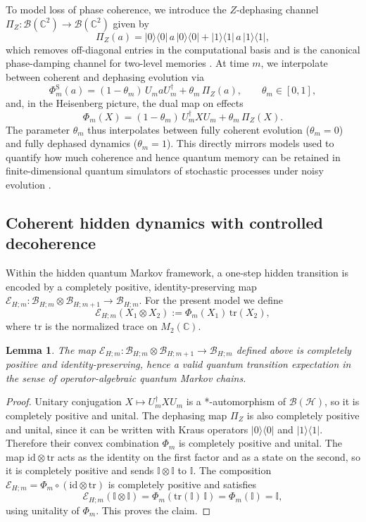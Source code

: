 \documentclass[12pt, reco]{article}
\newtheorem{lemma}[theorem]{Lemma}
\begin{document}
To model loss of phase coherence, we introduce the \(Z\)-dephasing channel \(\Pi_Z : \mathcal{B}(\mathbb{C}^2)\to\mathcal{B}(\mathbb{C}^2)\) given by
\[
\Pi_Z(a) = |0\rangle\langle0|\,a\,|0\rangle\langle0|
          + |1\rangle\langle1|\,a\,|1\rangle\langle1|,
\]
which removes off-diagonal entries in the computational basis and is the canonical phase-damping channel for two-level memories \cite{Banchi24}. At time \(m\), we interpolate between coherent and dephasing evolution via
\[
\Phi_m^{\mathrm{S}}(a)
  = (1-\theta_m)\,U_m a U_m^\dagger + \theta_m\,\Pi_Z(a),
  \qquad \theta_m \in [0,1],
\]
and, in the Heisenberg picture, the dual map on effects
\[
\Phi_m(X)
  = (1-\theta_m )\,U_m^\dagger X U_m + \theta_m \,\Pi_Z(X).
\]
The parameter \(\theta_m \) thus interpolates between fully coherent evolution (\(\theta_m  = 0\)) and fully dephased dynamics (\(\theta_m  = 1\)). This directly mirrors models used to quantify how much coherence and hence quantum memory can be retained in finite-dimensional quantum simulators of stochastic processes under noisy evolution \cite{Elliot21}.

\subsection{Coherent hidden dynamics with controlled decoherence}


Within the hidden quantum Markov framework, a one-step hidden transition is encoded by a completely positive, identity-preserving map \(\mathcal{E}_{H;m}:\mathcal{B}_{H;m}\otimes\mathcal{B}_{H;m+1}\to\mathcal{B}_{H;m}\). For the present model we define
\[
\mathcal{E}_{H;m}(X_1\otimes X_2) := \Phi_m(X_1)\,\mathrm{tr}(X_2),
\]
where \(\mathrm{tr}\) is the normalized trace on \(M_2(\mathbb{C})\).

\begin{lemma}
The map \(\mathcal{E}_{H;m} : \mathcal{B}_{H;m}\otimes\mathcal{B}_{H;m+1} \to \mathcal{B}_{H;m}\) defined above is completely positive and identity-preserving, hence a valid quantum transition expectation in the sense of operator-algebraic quantum Markov chains.
\end{lemma}

\begin{proof}
Unitary conjugation \(X\mapsto U_m^\dagger X U_m\) is a *-automorphism of \(\mathcal{B}(\mathcal{H})\), so it is completely positive and unital. The dephasing map \(\Pi_Z\) is also completely positive and unital, since it can be written with Kraus operators \(|0\rangle\langle0|\) and \(|1\rangle\langle1|\). Therefore their convex combination \(\Phi_m\) is completely positive and unital. The map \(\mathrm{id}\otimes\mathrm{tr}\) acts as the identity on the first factor and as a state on the second, so it is completely positive and sends \(\mathbb{I}\otimes \mathbb{I}\) to \(\mathbb{I}\). The composition \(\mathcal{E}_{H;m} = \Phi_m \circ (\mathrm{id}\otimes\mathrm{tr})\) is completely positive and satisfies
\[
\mathcal{E}_{H;m}(\mathbb{I}\otimes \mathbb{I})
  = \Phi_m(\mathrm{tr}(\mathbb{I})\,\mathbb{I})
  = \Phi_m(\mathbb{I})
  = \mathbb{I},
\]
using unitality of \(\Phi_m\). This proves the claim.
\end{proof}
\end{document}
